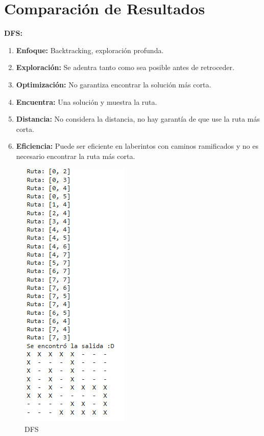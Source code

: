 \section{Comparación de Resultados} 
{\large\textbf{DFS:}}

\begin{enumerate}
    \item \textbf{Enfoque:} Backtracking, exploración profunda.
    \item \textbf{Exploración:} Se adentra tanto como sea posible antes de retroceder.
    \item \textbf{Optimización:} No garantiza encontrar la solución más corta.
    \item \textbf{Encuentra:} Una solución y muestra la ruta.
    \item \textbf{Distancia:} No considera la distancia, no hay garantía de que use la ruta más corta.
    \item \textbf{Eficiencia:} Puede ser eficiente en laberintos con caminos ramificados y no es 
    necesario encontrar la ruta más corta.
\end{enumerate}

\begin{figure}[h]
    \centering
    \includegraphics[scale = .4]{IMA/DFS.png}
    \caption{DFS}
    \label{fig:enter-label}
\end{figure}
\vspace{0.5cm}

